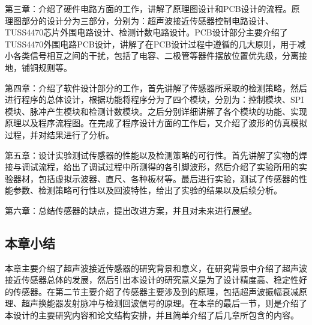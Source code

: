 第三章：介绍了硬件电路方面的工作，讲解了原理图设计和PCB设计的流程。原理图部分的设计分为三部分，分别为：超声波接近传感器控制电路设计、TUSS4470芯片外围电路设计、检测计数电路设计。PCB设计部分主要介绍了TUSS4470外围电路PCB设计，讲解了在PCB设计过程中遵循的几大原则，用于减小各类信号相互之间的干扰，包括了电容、二极管等器件摆放位置优先级，分离接地，铺铜规则等。

第四章：介绍了软件设计部分的工作，首先讲解了传感器所采取的检测策略，然后进行程序的总体设计，根据功能将程序分为了四个模块，分别为：控制模块、SPI模块、脉冲产生模块和检测计数模块。之后分别详细讲解了各个模块的功能、实现原理以及程序流程图。在完成了程序设计方面的工作后，又介绍了波形的仿真模拟过程，并对结果进行了分析。

第五章：设计实验测试传感器的性能以及检测策略的可行性。首先讲解了实物的焊接与调试流程，给出了调试过程中所测得的各引脚波形，然后介绍了实验所用的实验器材，包括虚拟示波器、直尺、各种板材等。最后进行实验，测试了传感器的性能参数、检测策略可行性以及回波特性，给出了实验的结果以及后续分析。

第六章：总结传感器的缺点，提出改进方案，并且对未来进行展望。

    \subsection{本章小结}
    本章主要介绍了超声波接近传感器的研究背景和意义，在研究背景中介绍了超声波接近传感器总体的发展，然后引出本设计的研究意义是为了设计精度高、稳定性好的传感器。在第二节主要介绍了传感器主要涉及到的原理，包括超声波振幅衰减原理、超声换能器发射脉冲与检测回波信号的原理。在本章的最后一节，则是介绍了本设计的主要研究内容和论文结构安排，并且简单介绍了后几章所包含的内容。